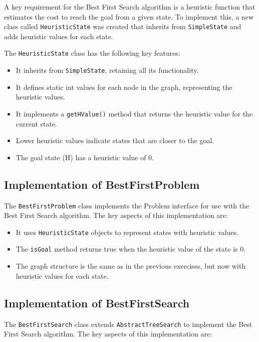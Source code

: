 \documentclass[12pt,a4paper]{article}
\begin{document}
A key requirement for the Best First Search algorithm is a heuristic function that estimates the cost to reach the goal from a given state. To implement this, a new class called \texttt{HeuristicState} was created that inherits from \texttt{SimpleState} and adds heuristic values for each state.

The \texttt{HeuristicState} class has the following key features:

\begin{itemize}
    \item It inherits from \texttt{SimpleState}, retaining all its functionality.
    \item It defines static int values for each node in the graph, representing the heuristic values.
    \item It implements a \texttt{getHValue()} method that returns the heuristic value for the current state.
    \item Lower heuristic values indicate states that are closer to the goal.
    \item The goal state (H) has a heuristic value of 0.
\end{itemize}

\subsection{Implementation of BestFirstProblem}

The \texttt{BestFirstProblem} class implements the Problem interface for use with the Best First Search algorithm. The key aspects of this implementation are:

\begin{itemize}
    \item It uses \texttt{HeuristicState} objects to represent states with heuristic values.
    \item The \texttt{isGoal} method returns true when the heuristic value of the state is 0.
    \item The graph structure is the same as in the previous exercises, but now with heuristic values for each state.
\end{itemize}

\subsection{Implementation of BestFirstSearch}

The \texttt{BestFirstSearch} class extends \texttt{AbstractTreeSearch} to implement the Best First Search algorithm. The key aspects of this implementation are:
\end{document}
